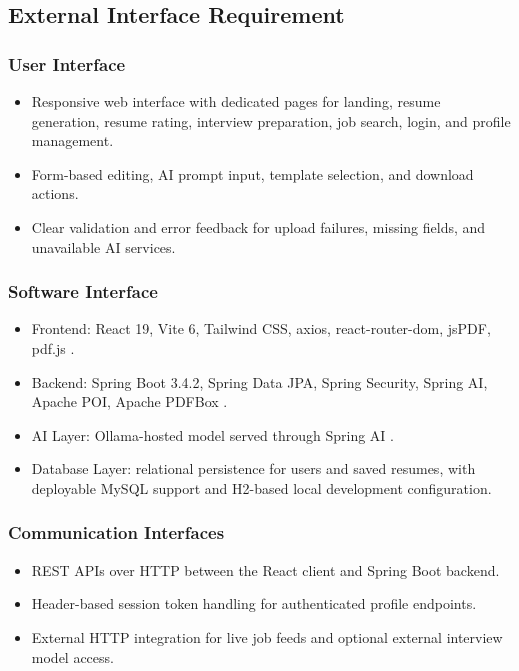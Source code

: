 \subsection{External Interface Requirement}
\subsubsection{User Interface}
\begin{itemize}
\item Responsive web interface with dedicated pages for landing, resume generation, resume rating, interview preparation, job search, login, and profile management.
\item Form-based editing, AI prompt input, template selection, and download actions.
\item Clear validation and error feedback for upload failures, missing fields, and unavailable AI services.
\end{itemize}

\subsubsection{Software Interface}
\begin{itemize}
\item Frontend: React 19, Vite 6, Tailwind CSS, axios, react-router-dom, jsPDF, pdf.js \cite{react_docs,vite_docs,jspdf_docs,pdfjs_docs}.
\item Backend: Spring Boot 3.4.2, Spring Data JPA, Spring Security, Spring AI, Apache POI, Apache PDFBox \cite{spring_boot_docs,spring_data_docs,spring_security_docs,spring_ai_docs,poi_docs,pdfbox_docs}.
\item AI Layer: Ollama-hosted model served through Spring AI \cite{ollama_docs,spring_ai_docs}.
\item Database Layer: relational persistence for users and saved resumes, with deployable MySQL support and H2-based local development configuration.
\end{itemize}

\subsubsection{Communication Interfaces}
\begin{itemize}
\item REST APIs over HTTP between the React client and Spring Boot backend.
\item Header-based session token handling for authenticated profile endpoints.
\item External HTTP integration for live job feeds and optional external interview model access.
\end{itemize}

